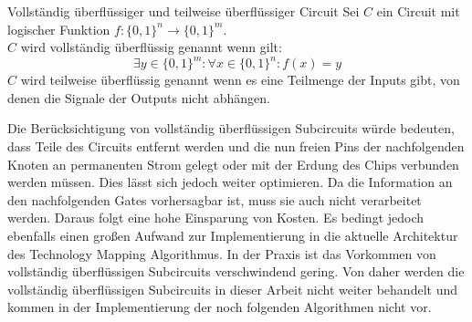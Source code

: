 \documentclass[11pt, a4paper, german]{article}
\newcommand{\TM}{Technology  Mapping }
\begin{document}
 \begin{definition}{Vollständig überflüssiger und teilweise überflüssiger Circuit }
 	Sei $C$ ein Circuit mit logischer Funktion $ f : \{ 0 , 1 \}^n \rightarrow \{ 0 , 1 \}^m $.\\
 	$C$ wird vollständig überflüssig genannt wenn gilt:
 	\[  \exists y \in \{0,1 \}^m :\forall x \in \{ 0, 1\}^n : f(x) = y  \]
 	$C$ wird teilweise überflüssig genannt wenn es eine Teilmenge der Inputs gibt, von denen die Signale der Outputs nicht abhängen.
 \end{definition}
 
Die Berücksichtigung von vollständig überflüssigen Subcircuits würde bedeuten, dass Teile des Circuits entfernt werden und die nun freien Pins der nachfolgenden Knoten an permanenten Strom gelegt oder mit der Erdung des Chips verbunden werden müssen. Dies lässt sich jedoch weiter optimieren. Da die Information an den nachfolgenden Gates vorhersagbar ist, muss sie auch nicht verarbeitet werden. Daraus folgt eine hohe Einsparung von Kosten. Es bedingt jedoch ebenfalls einen großen Aufwand zur Implementierung in die aktuelle Architektur des \TM Algorithmus. In der Praxis ist das Vorkommen von  vollständig überflüssigen Subcircuits verschwindend gering. Von daher werden die vollständig überflüssigen Subcircuits in dieser Arbeit nicht weiter behandelt und kommen in der Implementierung der noch folgenden Algorithmen nicht vor. \\
 
\end{document}
